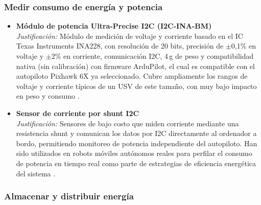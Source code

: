 \subsubsection*{Medir consumo de energía y potencia}

\begin{itemize}

  \item \textbf{Módulo de potencia Ultra-Precise I2C (I2C-INA-BM)} \\
  \textit{Justificación:} Módulo de medición de voltaje y corriente basado en el IC Texas Instruments 
  INA228, con resolución de 20 bits, precisión de $\pm$0,1\% en voltaje y $\pm$2\% en corriente, 
  comunicación I2C, 4\,g de peso y compatibilidad nativa (sin calibración) con firmware ArduPilot, el 
  cual es compatible con el autopiloto Pixhawk 6X ya seleccionado. Cubre ampliamente los rangos de 
  voltaje y corriente típicos de un USV de este tamaño, con muy bajo impacto en peso y consumo \cite{Cite21}. \\

  \item \textbf{Sensor de corriente por shunt I2C} \\
  \textit{Justificación:} Sensores de bajo costo que miden corriente mediante una resistencia shunt y 
  comunican los datos por I2C directamente al ordenador a bordo, permitiendo monitoreo de potencia 
  independiente del autopiloto. Han sido utilizados en robots móviles autónomos reales para perfilar el 
  consumo de potencia en tiempo real como parte de estrategias de eficiencia energética del sistema \cite{Cite20}. \\

\end{itemize}

\subsubsection*{Almacenar y distribuir energía}

